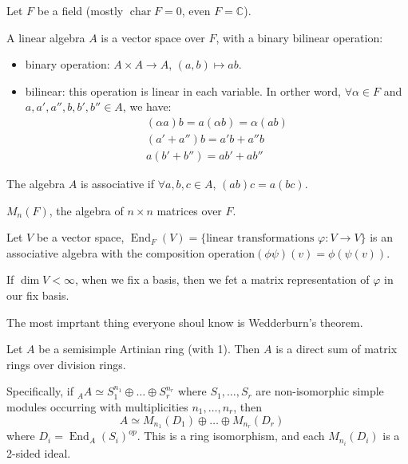 \documentclass[11pt, a4paper]{report}
\begin{document}
Let $ F $ be a field (mostly $ \operatorname{char}F =0$, even $ F=\mathbb{C} $). 

\begin{definition} 
A linear algebra $ A $ is a vector space over $ F $, with a binary bilinear operation:
\begin{itemize}
    \item binary operation: $ A \times A \to A $, $ (a,b) \mapsto ab $.
    \item bilinear: this operation is linear in each variable. In orther word, $ \forall \alpha \in F $ and $ a,a',a'',b,b',b'' \in A $, we have:
    \begin{align*}
    (\alpha a)b=a(\alpha b) = \alpha (ab) \\
    (a'+a'')b = a'b+a''b \\
    a(b'+b'')=ab'+ab''
    \end{align*}
\end{itemize}
The algebra $ A $ is associative if $ \forall a,b,c \in A $, $ (ab)c=a(bc) $.
\end{definition}

\begin{example} 
$ M_n(F) $, the algebra of $ n \times n $ matrices over $ F $.
\end{example}

\begin{example} 
Let $ V $ be a vector space, $ \operatorname{End}_F (V) =\{ \text{linear transformations } \varphi: V\to V \}$ is an associative algebra with the composition operation$ (\phi \psi) (v)=\phi(\psi(v))$. 

If $ \dim V < \infty $, when we fix a basis, then we fet a matrix representation of $ \varphi $ in our fix basis.
\end{example}

The most imprtant thing everyone shoul know is Wedderburn's theorem.

\begin{theorem}
    Let $A$ be a semisimple Artinian ring (with 1). Then $A$ is a direct sum of matrix rings over division rings. 
    
    Specifically, if ${}_A A \simeq S_1^{n_1} \oplus \dots \oplus S_r^{n_r}$ where $S_1, \dots, S_r$ are non-isomorphic simple modules occurring with multiplicities $n_1, \dots, n_r$, then
    \[
    A \simeq M_{n_1}(D_1) \oplus \dots \oplus M_{n_r}(D_r) \quad 
    \]
    where $D_i = \operatorname{End}_A(S_i)^{op}$. This is a ring isomorphism, and each $M_{n_i}(D_i)$ is a 2-sided ideal.
    \end{theorem}
    
\end{document}
